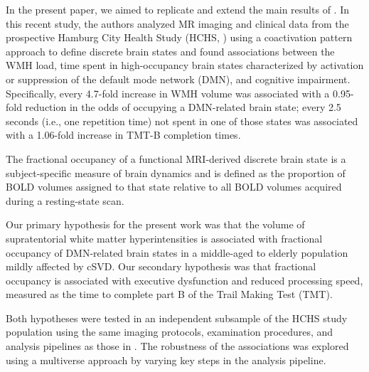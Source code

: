 In the present paper, we aimed to replicate and extend the main results of \citep{Schlemm2022-he}.
In this recent study, the authors analyzed MR imaging and clinical data from the prospective Hamburg City Health Study (HCHS, \citep{Jagodzinski2020-lx}) using a coactivation pattern approach to define discrete brain states and found associations between the WMH load, time spent in high-occupancy brain states characterized by activation or suppression of the default mode network (DMN), and cognitive impairment. 
Specifically, every 4.7-fold increase in WMH volume was associated with a 0.95-fold reduction in the odds of occupying a DMN-related brain state; every 2.5 seconds (i.e., one repetition time) not spent in one of those states was associated with a 1.06-fold increase in TMT-B completion times.

The fractional occupancy of a functional MRI-derived discrete brain state is a subject-specific measure of brain dynamics and is defined as the proportion of BOLD volumes assigned to that state relative to all BOLD volumes acquired during a resting-state scan.

Our primary hypothesis for the present work was that the volume of supratentorial white matter hyperintensities is associated with fractional occupancy of DMN-related brain states in a middle-aged to elderly population mildly affected by cSVD.
Our secondary hypothesis was that fractional occupancy is associated with executive dysfunction and reduced processing speed, measured as the time to complete part B of the Trail Making Test (TMT).

Both hypotheses were tested in an independent subsample of the HCHS study population using the same imaging protocols, examination procedures, and analysis pipelines as those in \citep{Schlemm2022-he}.
The robustness of the associations was explored using a multiverse approach by varying key steps in the analysis pipeline.

